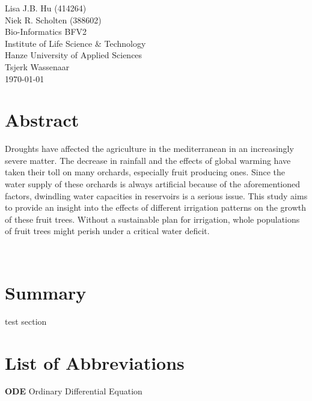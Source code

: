 \documentclass[
]{article}
\begin{document}
\normalsize
\vspace*{\fill}
\begin{flushright}
Lisa J.B. Hu (414264)\\
Niek R. Scholten (388602)\\
Bio-Informatics BFV2\\
Institute of Life Science \& Technology\\
Hanze University of Applied Sciences\\
Tsjerk Wassenaar\\
\today
\end{flushright}
\newpage

\section*{Abstract}

Droughts have affected the agriculture in the mediterranean in an increasingly severe matter.
The decrease in rainfall and the effects of global warming have taken their toll on many orchards, especially fruit producing ones.
Since the water supply of these orchards is always artificial because of the aforementioned factors, dwindling water capacities in reservoirs is a serious issue.
This study aims to provide an insight into the effects of different irrigation patterns on the growth of these fruit trees.
Without a sustainable plan for irrigation, whole populations of fruit trees might perish under a critical water deficit.

\label{sec:abstract}~
\newpage

\section*{Summary}
test section
\label{sec:summ}~
\newpage

\section*{List of Abbreviations}

\textbf{ODE} Ordinary Differential Equation

\label{sec:abvs}~

\newpage

{
\setcounter{tocdepth}{2}
\tableofcontents
}
\newpage

\end{document}
